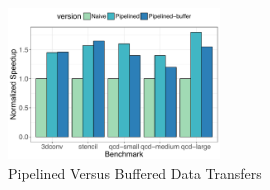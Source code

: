 \begin{figure}
  \centering
  \includegraphics[width=0.5\textwidth]{pics/pipelining-perf}
  \caption{Pipelined Versus Buffered Data Transfers\label{fig:pipeline-perf}}
\end{figure}

